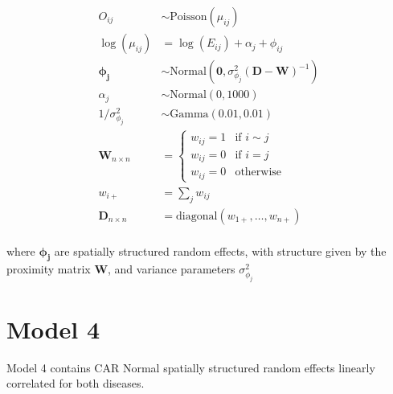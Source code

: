 \documentclass[10pt,letterpaper]{article}
\begin{document}
\begin{align*}
O_{ij}         &\sim   \mbox{Poisson}(\mu_{ij})\\
\log(\mu_{ij}) &=      \log(E_{ij}) + \alpha_{j} + \phi_{ij}\\ 
\boldsymbol{\phi_{j}}    &\sim   \mbox{Normal}(\mathbf{0}, \sigma^{2}_{\phi_{j}}(\boldsymbol{D}-\boldsymbol{W})^{-1})\\ 
\alpha_{j}    &\sim   \mbox{Normal}(0,1000)\\
1/\sigma^{2}_{\phi_{j}} &\sim \mbox{Gamma}(0.01, 0.01)\\
\boldsymbol{W}_{n \times n} &=
\left\{
\begin{array}{rl}
w_{ij} = 1 & \mbox{if } i \sim j \\
w_{ij} = 0 & \mbox{if } i = j    \\
w_{ij} = 0 & \mbox{otherwise}   
\end{array}
\right.\\
w_{i+}                      &=\sum_{j} w_{ij}\\
\boldsymbol{D}_{n \times n} &=\mbox{diagonal}(w_{1+},\dots,w_{n+})\\
\end{align*}

where $\boldsymbol{\phi_{j}}$ are spatially structured random effects, with structure given by the proximity matrix $\boldsymbol{W}$, and variance parameters $\sigma^{2}_{\phi_{j}}$ 
\newpage

\section*{Model 4}
Model 4 contains CAR Normal spatially structured random effects linearly correlated for both diseases. 
\end{document}
